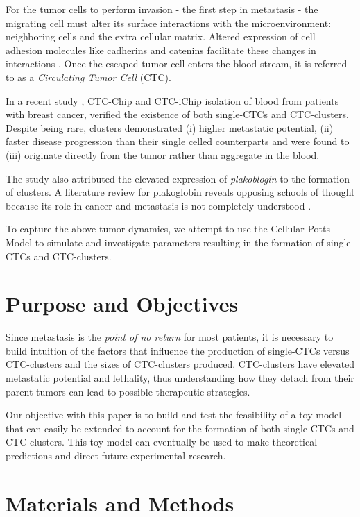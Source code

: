 \documentclass[12pt]{article}
\begin{document}
For the tumor cells to perform invasion - the first step in metastasis - the migrating cell must alter its surface interactions with the microenvironment: neighboring cells and the extra cellular matrix. Altered expression of cell adhesion molecules like cadherins and catenins facilitate these changes in interactions \cite{Aktary2012}\cite{Zhurinsky2000}. Once the escaped tumor cell enters the blood stream, it is referred to as a \emph{Circulating Tumor Cell} (CTC).

In a recent study \cite{Aceto2014}, CTC-Chip and CTC-iChip isolation of blood from patients with breast cancer, verified the existence of both single-CTCs and CTC-clusters. Despite being rare,  clusters demonstrated (i) higher metastatic potential, (ii) faster disease progression than their single celled counterparts and were found to (iii) originate directly from the tumor rather than aggregate in the blood.

The study also attributed the elevated expression of \emph{plakoblogin} to the formation of clusters. A literature review for plakoglobin reveals opposing schools of thought because its role in cancer and metastasis is not completely understood \cite{Aktary2012}\cite{Zhurinsky2000}.

To capture the above tumor dynamics, we attempt to use the Cellular Potts Model to simulate and investigate parameters resulting in the formation of single-CTCs and CTC-clusters.

\section{Purpose and Objectives}
Since metastasis is the \emph{point of no return} for most patients, it is necessary to build intuition of the factors that influence the production of single-CTCs versus CTC-clusters and the sizes of CTC-clusters produced. CTC-clusters have elevated metastatic potential and lethality, thus understanding how they detach from their parent tumors can lead to possible therapeutic strategies.

Our objective with this paper is to build and test the feasibility of a toy model that can easily be extended to account for the formation of both single-CTCs and CTC-clusters. This toy model can eventually be used to make theoretical predictions and direct future experimental research.

\section{Materials and Methods}
\end{document}

